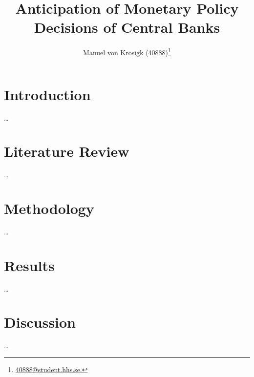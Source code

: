 \documentclass[%
a4paper, 12pt, DIV=calc, BCOR5mm,abstracton]{scrartcl}
\title{Anticipation of Monetary Policy Decisions of Central Banks}
\author{Manuel von Krosigk (40888)\footnote{\href{mailto:40888@student.hhs.se.}{40888@student.hhs.se.}}}
\newcounter{SeitenzahlSpeicher}
\begin{document}

\thispagestyle{empty}

\newpage

	
\renewcommand{\baselinestretch}{1.08}\normalsize %
\tableofcontents
\renewcommand{\baselinestretch}{1.0}\onehalfspacing
%
\clearpage
\listoffigures  {} 
\listoftables {}


\clearpage
\setcounter{SeitenzahlSpeicher}{\value{page}}



\section{Introduction} \label{ch:Intro}
\dots%

\section{Literature Review} \label{ch:Lit}
\dots%

\section{Methodology} \label{ch:Meth}
\dots%

\section{Results} \label{ch:Res}
\dots%

\section{Discussion} \label{ch:Disc}
\dots%
\end{document}
